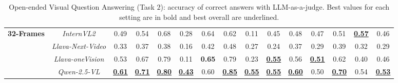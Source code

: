 \begin{table*}[]
{\begin{tabular}{lc|c|c|c|c|c|c|c|cc|cc|cc}
\multirow{4}{*}{\textbf{32-Frames}} & \textit{InternVL2} & 0.49 & 0.54 &  0.68   &  0.28 &  0.64 &  0.62&  0.11 &  0.45  &  0.48&  0.47 &  0.51 &  \underline{\textbf{0.57}} &  0.46 \\
 &  \textit{Llava-Next-Video} &  0.33 &  0.37 &  0.38   &  0.16 &  0.42 &  0.48&  0.27 &  0.24 &  0.37 &  0.29 &  0.39 &  0.32 &  0.29 \\
 &  \textit{Llava-oneVision} &  0.53 &  0.67 &  0.79  &  0.11 &  \textbf{0.65} &  0.79&  0.23 &  \underline{\textbf{0.55}} &  0.56 &  \underline{\textbf{0.51}} &  0.62 &  0.40 &  0.46 \\
 &  \textit{Qwen-2.5-VL} &  \underline{\textbf{0.61}} &  \underline{\textbf{0.71}} &  \underline{\textbf{0.80}}   &  \underline{\textbf{0.43}} &  0.60 &  \underline{\textbf{0.85}}&  \underline{\textbf{0.55}}&  \underline{\textbf{0.55}} &  \underline{\textbf{0.60}} &  0.50 &  \underline{\textbf{0.70}} &  0.54 &  \underline{\textbf{0.53}} \\ 
 \bottomrule
\end{tabular}%
}
 \caption{\label{tab:Task2_llm_as_judge}
    Open-ended Visual Question Answering (Task $2$): accuracy of correct answers with LLM-as-a-judge. Best values for each setting are in bold and best overall are underlined.
  }
\end{table*}

